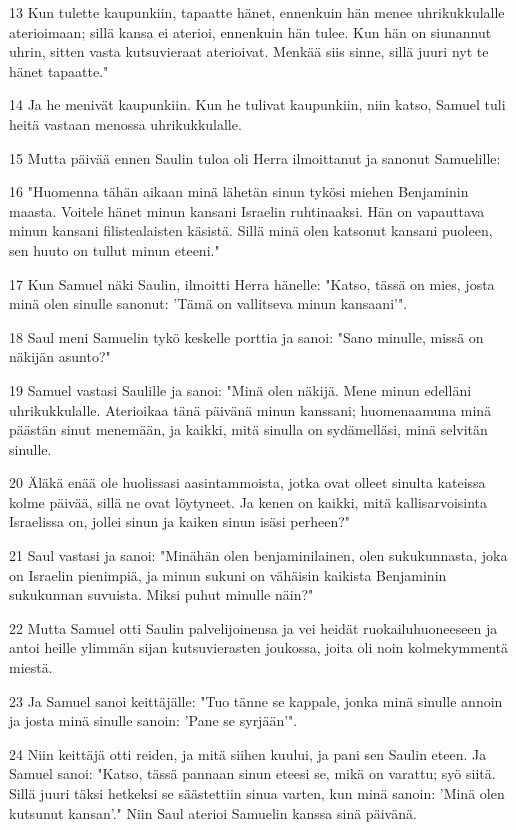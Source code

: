 \par 13 Kun tulette kaupunkiin, tapaatte hänet, ennenkuin hän menee uhrikukkulalle aterioimaan; sillä kansa ei aterioi, ennenkuin hän tulee. Kun hän on siunannut uhrin, sitten vasta kutsuvieraat aterioivat. Menkää siis sinne, sillä juuri nyt te hänet tapaatte."
\par 14 Ja he menivät kaupunkiin. Kun he tulivat kaupunkiin, niin katso, Samuel tuli heitä vastaan menossa uhrikukkulalle.
\par 15 Mutta päivää ennen Saulin tuloa oli Herra ilmoittanut ja sanonut Samuelille:
\par 16 "Huomenna tähän aikaan minä lähetän sinun tykösi miehen Benjaminin maasta. Voitele hänet minun kansani Israelin ruhtinaaksi. Hän on vapauttava minun kansani filistealaisten käsistä. Sillä minä olen katsonut kansani puoleen, sen huuto on tullut minun eteeni."
\par 17 Kun Samuel näki Saulin, ilmoitti Herra hänelle: "Katso, tässä on mies, josta minä olen sinulle sanonut: 'Tämä on vallitseva minun kansaani'".
\par 18 Saul meni Samuelin tykö keskelle porttia ja sanoi: "Sano minulle, missä on näkijän asunto?"
\par 19 Samuel vastasi Saulille ja sanoi: "Minä olen näkijä. Mene minun edelläni uhrikukkulalle. Aterioikaa tänä päivänä minun kanssani; huomenaamuna minä päästän sinut menemään, ja kaikki, mitä sinulla on sydämelläsi, minä selvitän sinulle.
\par 20 Äläkä enää ole huolissasi aasintammoista, jotka ovat olleet sinulta kateissa kolme päivää, sillä ne ovat löytyneet. Ja kenen on kaikki, mitä kallisarvoisinta Israelissa on, jollei sinun ja kaiken sinun isäsi perheen?"
\par 21 Saul vastasi ja sanoi: "Minähän olen benjaminilainen, olen sukukunnasta, joka on Israelin pienimpiä, ja minun sukuni on vähäisin kaikista Benjaminin sukukunnan suvuista. Miksi puhut minulle näin?"
\par 22 Mutta Samuel otti Saulin palvelijoinensa ja vei heidät ruokailuhuoneeseen ja antoi heille ylimmän sijan kutsuvierasten joukossa, joita oli noin kolmekymmentä miestä.
\par 23 Ja Samuel sanoi keittäjälle: "Tuo tänne se kappale, jonka minä sinulle annoin ja josta minä sinulle sanoin: 'Pane se syrjään'".
\par 24 Niin keittäjä otti reiden, ja mitä siihen kuului, ja pani sen Saulin eteen. Ja Samuel sanoi: "Katso, tässä pannaan sinun eteesi se, mikä on varattu; syö siitä. Sillä juuri täksi hetkeksi se säästettiin sinua varten, kun minä sanoin: 'Minä olen kutsunut kansan'." Niin Saul aterioi Samuelin kanssa sinä päivänä.
